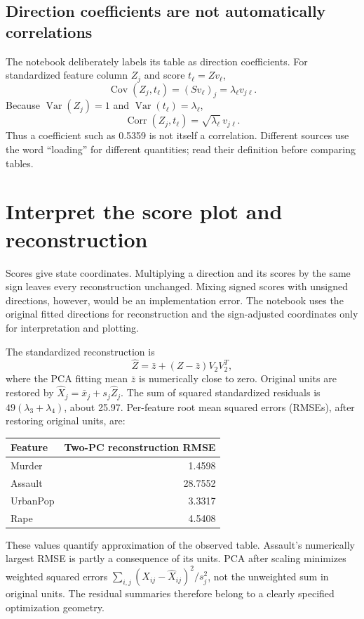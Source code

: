 \subsection*{Direction coefficients are not automatically correlations}
The notebook deliberately labels its table as direction coefficients. For standardized feature column $Z_j$ and score $t_\ell=Zv_\ell$,
\[
\operatorname{Cov}(Z_j,t_\ell)=(Sv_\ell)_j=\lambda_\ell v_{j\ell}.
\]
Because $\operatorname{Var}(Z_j)=1$ and $\operatorname{Var}(t_\ell)=\lambda_\ell$,
\[\operatorname{Corr}(Z_j,t_\ell)=\sqrt{\lambda_\ell}\,v_{j\ell}.\]
Thus a coefficient such as 0.5359 is not itself a correlation. Different sources use the word ``loading'' for different quantities;
read their definition before comparing tables.

\section{Interpret the score plot and reconstruction}
Scores give state coordinates. Multiplying a direction and its scores by the same sign leaves every reconstruction unchanged.
Mixing signed scores with unsigned directions, however, would be an implementation error.
The notebook uses the original fitted directions for reconstruction and the sign-adjusted coordinates only for interpretation and plotting.

The standardized reconstruction is
\[\widehat Z=\bar z+(Z-\bar z)V_2V_2^T,\]
where the PCA fitting mean $\bar z$ is numerically close to zero. Original units are restored by
$\widehat X_j=\bar x_j+s_j\widehat Z_j$.
The sum of squared standardized residuals is $49(\lambda_3+\lambda_4)$, about 25.97.
Per-feature root mean squared errors (RMSEs), after restoring original units, are:
\begin{center}\begin{tabular}{lr}\toprule
Feature&Two-PC reconstruction RMSE\\\midrule
Murder&1.4598\\Assault&28.7552\\UrbanPop&3.3317\\Rape&4.5408\\\bottomrule\end{tabular}\end{center}
These values quantify approximation of the observed table. Assault's numerically largest RMSE is partly a consequence of its units.
PCA after scaling minimizes weighted squared errors $\sum_{i,j}(X_{ij}-\widehat X_{ij})^2/s_j^2$,
not the unweighted sum in original units. The residual summaries therefore belong to a clearly specified optimization geometry.

